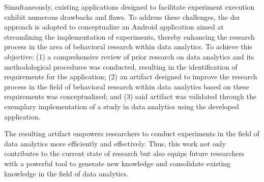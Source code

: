 Simultaneously, existing applications designed to facilitate experiment execution exhibit numerous drawbacks and flaws. To address these challenges, the \ac{dsr} approach is adopted to conceptualize an Android application aimed at streamlining the implementation of experiments, thereby enhancing the research process in the area of behavioral research within data analytics. To achieve this objective: (1) a comprehensive review of prior research on data analytics and its methodological procedures was conducted, resulting in the identification of requirements for the application; (2) an artifact designed to improve the research process in the field of behavioral research within data analytics based on these requirements was conceptualized; and (3) said artifact was validated through the exemplary implementation of a study in data analytics using the developed application.

The resulting artifact empowers researchers to conduct experiments in the field of data analytics more efficiently and effectively. Thus, this work not only contributes to the current state of research but also equips future researchers with a powerful tool to generate new knowledge and consolidate existing knowledge in the field of data analytics.

\newpage









